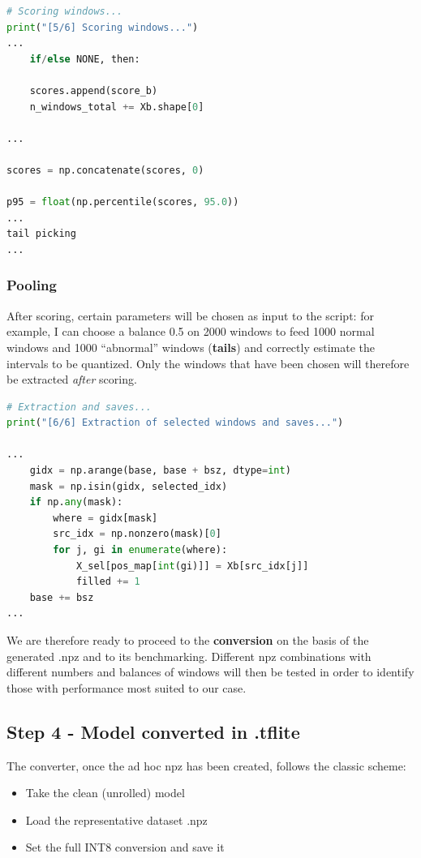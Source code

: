 \begin{lstlisting}[language=Python]
# Scoring windows...
print("[5/6] Scoring windows...")
...
    if/else NONE, then:

    scores.append(score_b)
    n_windows_total += Xb.shape[0]

...

scores = np.concatenate(scores, 0)

p95 = float(np.percentile(scores, 95.0))
...
tail picking
...

\end{lstlisting}

\subsubsection{Pooling}
After scoring, certain parameters will be chosen as input to the script: for example, I can choose a balance 0.5 on 2000 windows to feed 1000 normal windows and 1000 ``abnormal'' windows (\textbf{tails}) and correctly estimate the intervals to be quantized. Only the windows that have been chosen will therefore be extracted \textit{after} scoring.

\begin{lstlisting}[language=Python]
# Extraction and saves...
print("[6/6] Extraction of selected windows and saves...")

...
    gidx = np.arange(base, base + bsz, dtype=int)
    mask = np.isin(gidx, selected_idx)
    if np.any(mask):
        where = gidx[mask]
        src_idx = np.nonzero(mask)[0]
        for j, gi in enumerate(where):
            X_sel[pos_map[int(gi)]] = Xb[src_idx[j]]
            filled += 1
    base += bsz
...
\end{lstlisting}

We are therefore ready to proceed to the \textbf{conversion} on the basis of the generated .npz and to its benchmarking. Different npz combinations with different numbers and balances of windows will then be tested in order to identify those with performance most suited to our case.

\subsection{Step 4 - Model converted in .tflite}

The converter, once the ad hoc npz has been created, follows the classic scheme:

\begin{itemize}
    \item Take the clean (unrolled) model
    \item Load the representative dataset .npz
    \item Set the full INT8 conversion and save it
\end{itemize}

